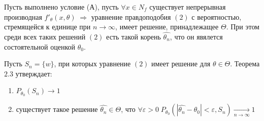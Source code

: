 \begin{theorem}\label{lec:2/the:2}
	Пусть выполнено условие (А), пусть $\forall x \in N_f$ существует непрерывная производная $f'_{\theta} (x, \theta) \; \Rightarrow$ уравнение правдоподобия $(2)$ с вероятностью, стремящейся к единице при $n \to \infty$, имеет решение, принадлежащее $\Theta$. При этом среди всех таких решений $(2)$ есть такой корень $\hat{\theta_n}$, что он явялется состоятельной оценкой $\theta_0$.
\end{theorem}
\begin{Proof}
	Пусть $S_n = \{w\}$, при которых уравнение $(2)$ имеет решение для $\theta \in \Theta$. Теорема $2.3$ утверждает:
	\begin{enumerate}
		\item $P_{\theta_0} (S_n) \to 1$
		\item существует такое решение $\hat{\theta_n} \in \Theta$, что $\forall \varepsilon > 0 \; P_{\theta_0} (|\hat{\theta_n} - \theta_0| < \varepsilon , S_n) \xrightarrow[n \to \infty]{} 1$
	\end{enumerate}


\end{Proof}

